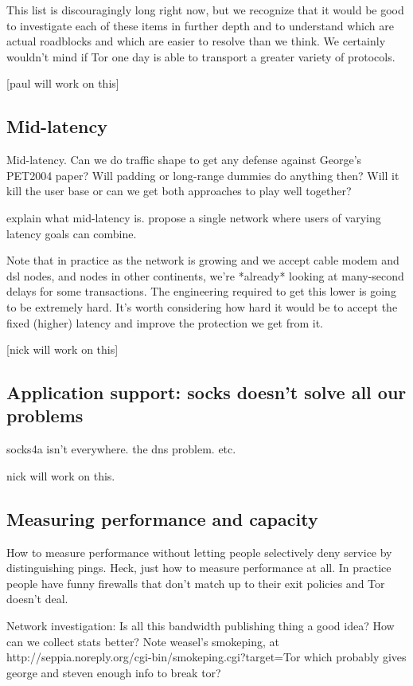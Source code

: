 \documentclass{llncs}
\begin{document}
This list is discouragingly long right now, but we recognize that it
would be good to investigate each of these items in further depth and to
understand which are actual roadblocks and which are easier to resolve
than we think. We certainly wouldn't mind if Tor one day is able to
transport a greater variety of protocols.

[paul will work on this]

\subsection{Mid-latency}
\label{subsec:mid-latency}

Mid-latency. Can we do traffic shape to get any defense against George's
PET2004 paper? Will padding or long-range dummies do anything then? Will
it kill the user base or can we get both approaches to play well together?

explain what mid-latency is. propose a single network where users of
varying latency goals can combine.

Note that in practice as the network is growing and we accept cable
modem and dsl nodes, and nodes in other continents, we're *already*
looking at many-second delays for some transactions. The engineering
required to get this lower is going to be extremely hard. It's worth
considering how hard it would be to accept the fixed (higher) latency
and improve the protection we get from it.

[nick will work on this]

\subsection{Application support: socks doesn't solve all our problems}

socks4a isn't everywhere. the dns problem. etc.

nick will work on this.

\subsection{Measuring performance and capacity}

How to measure performance without letting people selectively deny service
by distinguishing pings. Heck, just how to measure performance at all. In
practice people have funny firewalls that don't match up to their exit
policies and Tor doesn't deal.

Network investigation: Is all this bandwidth publishing thing a good idea?
How can we collect stats better? Note weasel's smokeping, at
http://seppia.noreply.org/cgi-bin/smokeping.cgi?target=Tor
which probably gives george and steven enough info to break tor?
\end{document}
